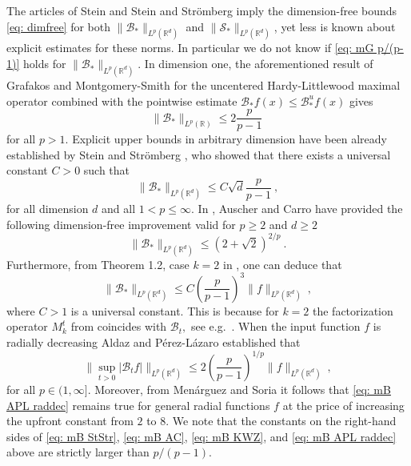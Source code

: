 \documentclass[a4paper, reqno]{amsart}
\theoremstyle{definition}
\newcommand{\R}{{\mathbb R}}
\newcommand{\mB}{\mathcal{B}}
\newcommand{\mS}{\mathcal{S}}
\begin{document}
The articles of Stein \cite{St82} and Stein and Strömberg \cite{SS83} imply the dimension-free bounds \eqref{eq: dimfree} for both $\|\mB_*\|_{L^p(\R^d)}$ and $\|\mS_*\|_{L^p(\R^d)}$, yet less is known about explicit estimates for these norms. In particular we do not know if \eqref{eq: mG p/(p-1)} holds for $\|\mB_*\|_{L^p(\R^d)}.$ 
In dimension one, the aforementioned result of Grafakos and Montgomery-Smith \cite{GM-S1} for the uncentered Hardy-Littlewood maximal operator combined with the pointwise estimate $ \mB_\ast f(x)\leq \mB_\ast^uf(x)$ gives
$$ \|\mB_\ast\|_{L^p(\mathbb{R})}\leq 2\frac{p}{p-1}~$$
for all $p>1$. Explicit upper bounds in arbitrary dimension have been already established by Stein and Strömberg \cite{SS83}, who showed that there exists a universal constant $C>0$ such that
\begin{equation}
\label{eq: mB StStr}
\|\mB_*\|_{L^p(\R^d)}\leq C\sqrt{d}\frac{p}{p-1}~,
\end{equation}
for all dimension $d$ and all $1<p\leq\infty$. 
In \cite{AC94}, Auscher and Carro have provided the following dimension-free improvement valid for $p\geq 2$ and  $d\ge 2$
\begin{equation}
\label{eq: mB AC}
\|\mB_*\|_{L^p(\R^d)}\leq (2+\sqrt{2})^{2/p}~.
\end{equation}
 Furthermore,
from Theorem 1.2, case $k=2$ in \cite{KWZ}, one can deduce that
\begin{equation}
\label{eq: mB KWZ}
\|\mB_*\|_{L^p(\R^d)}\leq C\left(\frac{p}{p-1}\right)^{3}\|f\|_{L^p(\R^d)}~,
\end{equation}
where $C>1$ is a universal constant. This is because for $k=2$ the factorization operator $M_k^t$ from \cite{KWZ} coincides with $\mB_t,$ see e.g.\ \cite[p.\ 427]{Ver1}.
When the input function $f$ is radially decreasing Aldaz and P\'erez-L\'azaro \cite[Corollary 2.8]{APL} established that
\begin{equation}
\label{eq: mB APL raddec}
\|\sup_{t>0}|\mB_t f|\|_{L^p(\R^d)}\leq 2\left(\frac{p}{p-1}\right)^{1/p}\|f\|_{L^p(\R^d)}~,
\end{equation}
for all $p\in (1,\infty].$ Moreover, from Men\'arguez and Soria \cite[Theorem 3]{MS1} it follows that \eqref{eq: mB APL raddec} remains true for general radial functions $f$ at the price of increasing the upfront constant from $2$ to $8.$ We note that the constants on the right-hand sides of \eqref{eq: mB StStr}, \eqref{eq: mB AC},  \eqref{eq: mB KWZ}, and \eqref{eq: mB APL raddec} above are strictly larger than $p/(p-1).$  
\end{document}
